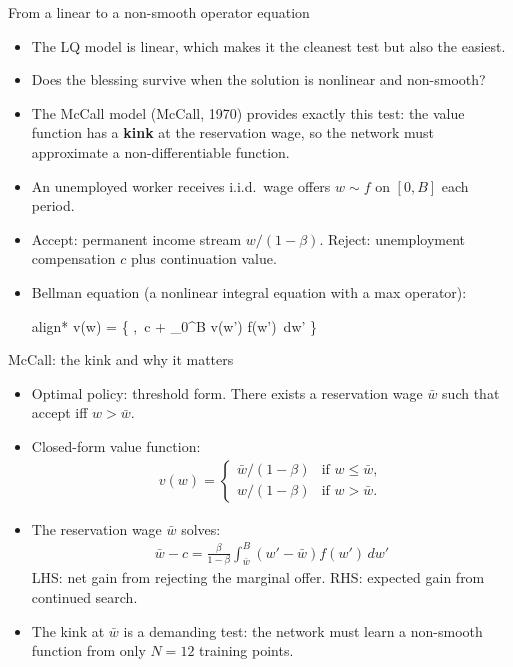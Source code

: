 \documentclass[aspectratio=169,10pt]{beamer}
\newcommand{\emphcolor}[1]{\textbf{\textcolor{emphcolorval}{#1}}}
\begin{document}
\begin{frame}{From a linear to a non-smooth operator equation}
	\begin{itemize}
		\item The LQ model is linear, which makes it the cleanest test but also the easiest.
		\item Does the blessing survive when the solution is nonlinear and non-smooth?
		\item The McCall model (\textcolor{emphcolorval}{McCall, 1970}) provides exactly this test: the value function has a \emphcolor{kink} at the reservation wage, so the network must approximate a non-differentiable function.
		\item An unemployed worker receives i.i.d.\ wage offers $w \sim f$ on $[0,B]$ each period.
		\item Accept: permanent income stream $w/(1-\beta)$. Reject: unemployment compensation $c$ plus continuation value.
		\item Bellman equation (a nonlinear integral equation with a max operator):
		\begin{empheq}[box=\tcbhighmath]{align*}
			v(w) = \max\left\{ ,\ c + \beta \int_0^B v(w') f(w')\, dw' \right\}
		\end{empheq}
	\end{itemize}
\end{frame}

\begin{frame}{McCall: the kink and why it matters}
	\begin{itemize}
		\item Optimal policy: threshold form. There exists a reservation wage $\bar{w}$ such that accept iff $w > \bar{w}$.
		\item Closed-form value function:
		\begin{align*}
			v(w) = \begin{cases} \bar{w}/(1-\beta) & \text{if } w \le \bar{w}, \\ w/(1-\beta) & \text{if } w > \bar{w}. \end{cases}
		\end{align*}
		\item The reservation wage $\bar{w}$ solves:
		\begin{align*}
			\bar{w} - c = \frac{\beta}{1-\beta} \int_{\bar{w}}^B (w' - \bar{w}) f(w')\, dw'
		\end{align*}
		LHS: net gain from rejecting the marginal offer. RHS: expected gain from continued search.
		\item The kink at $\bar{w}$ is a demanding test: the network must learn a non-smooth function from only $N = 12$ training points.
	\end{itemize}
\end{frame}
\end{document}
